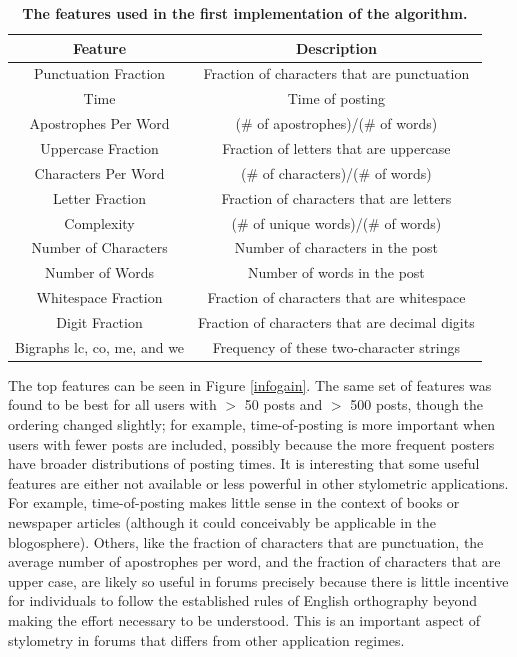 \documentclass[12pt,letterpaper,onecolumn,oneside]{article}
\numberwithin{equation}{section}
\numberwithin{figure}{section}
\begin{document}
\begin{table}[H]
\begin{center}
  \begin{tabular}{| c | c |}
    \hline
    \textbf{Feature} & \textbf{Description} \\ \hline
    Punctuation Fraction & Fraction of characters that are punctuation\\ \hline
    Time & Time of posting\\ \hline
    Apostrophes Per Word & (\# of apostrophes)/(\# of words)\\ \hline
    Uppercase Fraction & Fraction of letters that are uppercase\\ \hline
    Characters Per Word & (\# of characters)/(\# of words)\\ \hline
    Letter Fraction & Fraction of characters that are letters\\ \hline
    Complexity & (\# of unique words)/(\# of words)\\ \hline
    Number of Characters & Number of characters in the post\\ \hline
    Number of Words & Number of words in the post\\ \hline
    Whitespace Fraction & Fraction of characters that are whitespace\\ \hline
    Digit Fraction & Fraction of characters that are decimal digits\\ \hline
    Bigraphs lc, co, me, and we & Frequency of these two-character strings\\ \hline
  \end{tabular}
  \caption{\textbf{\footnotesize{The features used in the first implementation of the algorithm.}}}
  \label{selfeat}
\end{center}
\end{table}

The top features can be seen in Figure \ref{infogain}. The same set of features was found to be best for all users with \(>\) 50 posts and \(>\) 500 posts, though the ordering changed slightly; for example, 
time-of-posting is more important when users with fewer posts are included, possibly because the more frequent posters have broader distributions of posting times.  It is interesting that some useful features are 
either not available or less powerful in other stylometric applications. For example, time-of-posting makes little sense in the context of books or newspaper articles (although it could conceivably be applicable in the 
blogosphere). Others, like the fraction of characters that are punctuation, the average number of apostrophes per word, and the fraction of characters that are upper case, are likely so useful in forums precisely 
because there is little incentive for individuals to follow the established rules of English orthography beyond making the effort necessary to be understood. This is an important aspect of stylometry in forums that 
differs from other application regimes.
\end{document}
